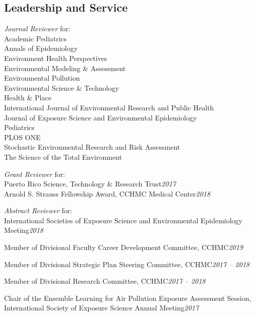 \documentclass[margin,line]{res}
\newenvironment{list3}{
  \begin{list}{}{%
      \setlength{\itemsep}{0in}
      \setlength{\parsep}{0in} \setlength{\parskip}{0in}
      \setlength{\topsep}{0in} \setlength{\partopsep}{0in}
      \setlength{\leftmargin}{0in}}}{\end{list}}
\begin{document}
\begin{resume}
\section{\sc Leadership and Service}
\begin{list3} \itemsep 4pt
\item[] \textit{Journal Reviewer} for: \\
        Academic Pediatrics \\
        Annals of Epidemiology \\
        Environment Health Perspectives \\
        Environmental Modeling \& Assessment \\
        Environmental Pollution \\
        Environmental Science \& Technology \\
        Health \& Place \\
        International Journal of Environmental Research and Public Health \\
        Journal of Exposure Science and Environmental Epidemiology \\
        Pediatrics \\
        PLOS ONE \\
        Stochastic Environmental Research and Risk Assessment \\
        The Science of the Total Environment
\item[] \textit{Grant Reviewer} for: \\
        Puerto Rico Science, Technology \& Research Trust\hfill \textit{2017}\\
        Arnold S. Strauss Fellowship Award, CCHMC
        Medical Center\hfill \textit{2018}
\item[] \textit{Abstract Reviewer} for: \\
        International Societies of Exposure Science and Environmental Epidemiology Meeting\hfill \textit{2018}
\item[] Member of Divisional Faculty Career Development Committee, CCHMC\hfill \textit{2019}
\item[] Member of Divisional Strategic Plan Steering Committee, CCHMC\hfill \textit{2017 -- 2018}
\item[] Member of Divisional Research Committee, CCHMC\hfill \textit{2017 -- 2018}
\item[] Chair of the Ensemble Learning for Air Pollution Exposure Assessment Session, \\International Society of Exposure Science Annual Meeting\hfill \textit{2017}

\end{list3}
\end{resume}
\end{document}
